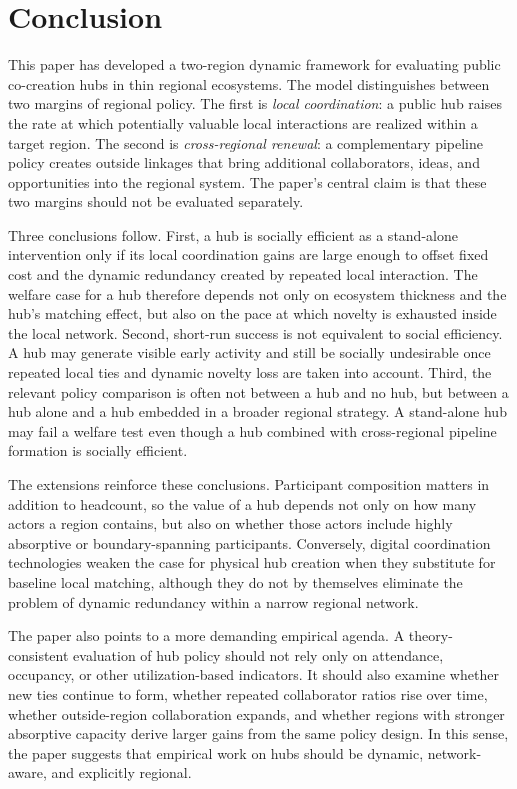 \section{Conclusion}
\label{sec:conclusion}

This paper has developed a two-region dynamic framework for evaluating public co-creation hubs in thin regional ecosystems. The model distinguishes between two margins of regional policy. The first is \emph{local coordination}: a public hub raises the rate at which potentially valuable local interactions are realized within a target region. The second is \emph{cross-regional renewal}: a complementary pipeline policy creates outside linkages that bring additional collaborators, ideas, and opportunities into the regional system. The paper's central claim is that these two margins should not be evaluated separately.

Three conclusions follow. First, a hub is socially efficient as a stand-alone intervention only if its local coordination gains are large enough to offset fixed cost and the dynamic redundancy created by repeated local interaction. The welfare case for a hub therefore depends not only on ecosystem thickness and the hub's matching effect, but also on the pace at which novelty is exhausted inside the local network. Second, short-run success is not equivalent to social efficiency. A hub may generate visible early activity and still be socially undesirable once repeated local ties and dynamic novelty loss are taken into account. Third, the relevant policy comparison is often not between a hub and no hub, but between a hub alone and a hub embedded in a broader regional strategy. A stand-alone hub may fail a welfare test even though a hub combined with cross-regional pipeline formation is socially efficient.

The extensions reinforce these conclusions. Participant composition matters in addition to headcount, so the value of a hub depends not only on how many actors a region contains, but also on whether those actors include highly absorptive or boundary-spanning participants. Conversely, digital coordination technologies weaken the case for physical hub creation when they substitute for baseline local matching, although they do not by themselves eliminate the problem of dynamic redundancy within a narrow regional network.

The paper also points to a more demanding empirical agenda. A theory-consistent evaluation of hub policy should not rely only on attendance, occupancy, or other utilization-based indicators. It should also examine whether new ties continue to form, whether repeated collaborator ratios rise over time, whether outside-region collaboration expands, and whether regions with stronger absorptive capacity derive larger gains from the same policy design. In this sense, the paper suggests that empirical work on hubs should be dynamic, network-aware, and explicitly regional.

